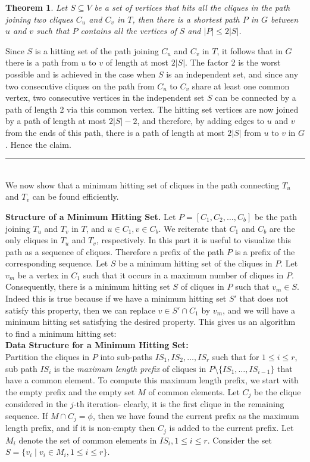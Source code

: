 \documentclass[MS,synopsis]{iitmdiss}
\newtheorem{theorem}{Theorem}
\newcommand{\qed}{\rule{7pt}{7pt}}
\newenvironment{proof}{\noindent{\bf Proof}\hspace*{1em}}{\hfill\qed\bigskip}
\begin{document}
 \begin{theorem}\label{the:4}
 Let $S \subseteq V$ be a set of  vertices that hits all the cliques in the path joining two cliques $C_u$ and $C_v$ in $T$,
 then there is a shortest path $P$ in $G$ between $u$ and $v$ such that $P$ contains all the vertices of $S$ and $|P| \leq 2|S|$.
 \end{theorem}
 \begin{proof}
 Since $S$ is a hitting set of the path joining $C_u$ and $C_v$ in $T$, it follows that in $G$ there is a path from $u$ to $v$ of length at most $2 |S|$.
 The factor 2 is the worst possible and is achieved in the case when $S$ is an independent set, 
 and since any two consecutive cliques on the path from $C_u$ to $C_v$ share at least one common vertex,
 two consecutive vertices in the independent set $S$ can be connected by a path of length 2 via this common vertex.
 The hitting set vertices are now joined by a path of length at most $2|S|-2$, 
 and therefore, by adding edges to $u$ and $v$ from the ends of this path, there is a path of length at most $2|S|$ from $u$ to $v$ in $G$.  Hence the claim.
 \end{proof}
 \\
 We now show that a minimum hitting set of cliques in the path connecting $T_u$ and $T_v$ can be found efficiently. 
 
 \noindent
 {\bf Structure of a Minimum Hitting Set.} 
 Let $P = [C_1,C_{2},\dots,C_b]$ be the path joining $T_u$ and $T_v$ in $T$, and $u \in C_1, v \in C_b$. 
 We reiterate that $C_1$ and $C_b$ are the only cliques in $T_u$ and $T_v$, respectively.  
 In this part it is useful to visualize this path as a sequence of cliques. 
 Therefore a prefix of the path $P$ is a prefix of the corresponding sequence. 
 Let $S$ be a minimum hitting set of the cliques in $P$. 
 Let $v_m$ be a vertex in $C_1$ such that it occurs in a maximum number of cliques in $P$. 
 Consequently, there is a minimum hitting set $S$ of cliques in $P$ such that $v_m \in S$. 
 Indeed this is true because if we have a minimum hitting set $S'$ that does not satisfy this property, 
 then we can replace $v \in S' \cap C_1$ by $v_m$, and we will have a minimum hitting set satisfying the desired property. 
 This gives us an algorithm to find a minimum hitting set: \\
 {\bf Data Structure for a Minimum Hitting Set:}\\
 Partition the cliques in $P$ into  sub-paths $IS_1,IS_2,\dots,IS_r$ such that
 for  $1 \leq i \leq r$, sub path $IS_i$ is the {\em maximum length prefix} of cliques in $P \setminus \{IS_1,\ldots, IS_{i-1}\}$ that have a common element.
 To compute this maximum length prefix, we start with the empty prefix and the empty set $M$ of common elements. 
 Let $C_j$ be the clique considered in the $j$-th iteration- clearly, it is the first clique in the remaining sequence. 
 If $M \cap C_j = \phi$, then we have found the current prefix as the maximum length prefix, and if it is non-empty then $C_j$ is added to the current prefix.
 Let $M_i$ denote the set of common elements in $IS_i, 1 \leq i \leq r$.   Consider the set $S = \{v_i \mid v_i \in M_i, 1 \leq i \leq r\}$.
\end{document}
